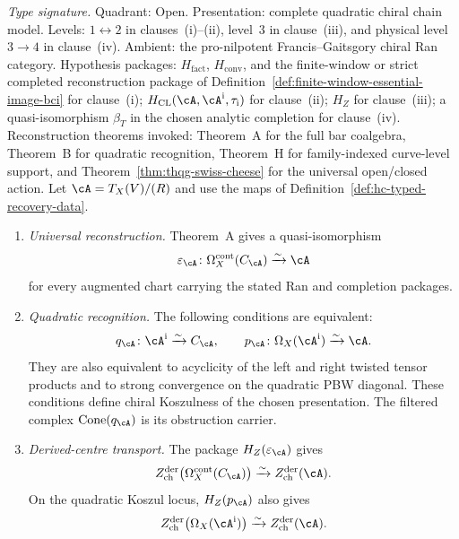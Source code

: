 \begin{theorem}
\label{thm:hc-koszulness-exact-qec}
\textit{Type signature.} Quadrant: Open. Presentation: complete
quadratic chiral chain model. Levels: $1\leftrightarrow2$ in
clauses~\textup{(i)--(ii)}, level~$3$ in clause~\textup{(iii)}, and
physical level~$3\to4$ in clause~\textup{(iv)}. Ambient: the
pro-nilpotent Francis--Gaitsgory chiral Ran category. Hypothesis
packages: $H_{\mathrm{fact}}$, $H_{\mathrm{conv}}$, and the finite-window or
strict completed reconstruction package of
Definition~\ref{def:finite-window-essential-image-bci} for
clause~\textup{(i)};
$H_{\mathrm{CL}}(\cA,\cA^{\mathrm i},\tau_{\mathrm i})$ for
clause~\textup{(ii)}; $H_Z$ for clause~\textup{(iii)}; a
quasi-isomorphism $\beta_T$ in the chosen analytic completion for
clause~\textup{(iv)}. Reconstruction theorems invoked: Theorem~A for
the full bar coalgebra, Theorem~B for quadratic recognition,
Theorem~H for family-indexed curve-level support, and
Theorem~\ref{thm:thqg-swiss-cheese} for the universal open/closed
action.
\smallskip\noindent
Let $\cA=T_X(V)/(R)$ and use the maps of
Definition~\textup{\ref{def:hc-typed-recovery-data}}.
\begin{enumerate}[label=\textup{(\roman*)}]
\item \emph{Universal reconstruction.}
Theorem~A gives a quasi-isomorphism
\[
\varepsilon_\cA\colon
\Omega_X^{\mathrm{cont}}(C_\cA)\xrightarrow{\sim}\cA
\]
for every augmented chart carrying the stated Ran and completion
packages.

\item \emph{Quadratic recognition.}
The following conditions are equivalent:
\[
q_\cA\colon\cA^{\mathrm i}\xrightarrow{\sim}C_\cA,
\qquad
p_\cA\colon\Omega_X(\cA^{\mathrm i})\xrightarrow{\sim}\cA.
\]
They are also equivalent to acyclicity of the left and right twisted
tensor products and to strong convergence on the quadratic PBW
diagonal.  These conditions define chiral Koszulness of the chosen
presentation.  The filtered complex
$\operatorname{Cone}(q_\cA)$ is its obstruction carrier.

\item \emph{Derived-centre transport.}
The package $H_Z(\varepsilon_\cA)$ gives
\[
Z^{\mathrm{der}}_{\mathrm{ch}}
\bigl(\Omega_X^{\mathrm{cont}}(C_\cA)\bigr)
\xrightarrow{\sim}Z^{\mathrm{der}}_{\mathrm{ch}}(\cA).
\]
On the quadratic Koszul locus, $H_Z(p_\cA)$ also gives
\[
Z^{\mathrm{der}}_{\mathrm{ch}}
\bigl(\Omega_X(\cA^{\mathrm i})\bigr)
\xrightarrow{\sim}Z^{\mathrm{der}}_{\mathrm{ch}}(\cA).
\]


\end{enumerate}
\end{theorem}
